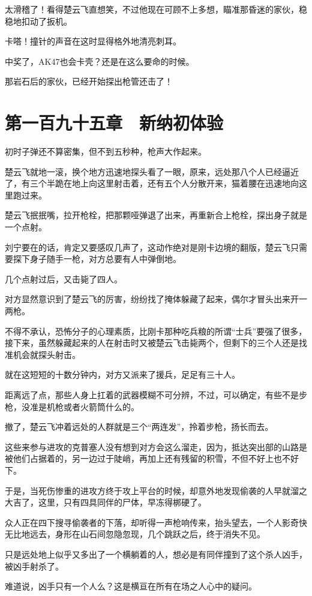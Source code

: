 太滑稽了！看得楚云飞直想笑，不过他现在可顾不上多想，瞄准那昏迷的家伙，稳稳地扣动了扳机。

卡嗒！撞针的声音在这时显得格外地清亮刺耳。

中奖了，AK47也会卡壳？还是在这么要命的时候。

那岩石后的家伙，已经开始探出枪管还击了！

\section{第一百九十五章　新纳初体验}

初时子弹还不算密集，但不到五秒种，枪声大作起来。

楚云飞就地一滚，换个地方迅速地探头看了一眼，原来，远处那八个人已经逼近了，有三个半跪在地上向这里射击着，还有五个人分散开来，猫着腰在迅速地向这里跑过来。

楚云飞抿抿嘴，拉开枪栓，把那颗哑弹退了出来，再重新合上枪栓，探出身子就是一个点射。

刘宁要在的话，肯定又要感叹几声了，这动作绝对是刚卡边境的翻版，楚云飞只需要探下身子随手一枪，对方总要有人中弹倒地。

几个点射过后，又击毙了四人。

对方显然意识到了楚云飞的厉害，纷纷找了掩体躲藏了起来，偶尔才冒头出来开一两枪。

不得不承认，恐怖分子的心理素质，比刚卡那种吃兵粮的所谓“士兵”要强了很多，接下来，虽然躲藏起来的人在射击时又被楚云飞击毙两个，但剩下的三个人还是找准机会就探头射击。

就在这短短的十数分钟内，对方又派来了援兵，足足有三十人。

距离远了点，那些人身上扛着的武器模糊不可分辨，不过，可以确定，有些不是步枪，没准是机枪或者火箭筒什么的。

撤了，楚云飞冲着远处的人群就是三个“两连发”，拎着步枪，扬长而去。

这些来参与进攻的克普塞人没有想到对方会这么溜走，因为，抵达突出部的山路是被他们占据着的，另一边过于陡峭，再加上还有残留的积雪，不但不好上也不好下。

于是，当死伤惨重的进攻方终于攻上平台的时候，却意外地发现偷袭的人早就溜之大吉了，这里，只有四具同伴的尸体，早冻得梆硬了。

众人正在四下搜寻偷袭者的下落，却听得一声枪响传来，抬头望去，一个人影奇快无比地远去，身形在山石间忽隐忽现，几个跳跃之后，终于消失不见。

只是远处地上似乎又多出了一个横躺着的人，想必是有同伴撞到了这个杀人凶手，被凶手射杀了。

难道说，凶手只有一个人么？这是横亘在所有在场之人心中的疑问。

